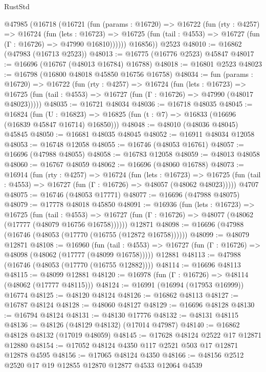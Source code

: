\begin{lexlean}{RustStd}
\begin{coremodule}
    @47985
      (@16718
        (@16721
          (fun (params : @16720) =>
          @16722
            (fun (rty : @4257) =>
            @16724
              (fun (lets : @16723) =>
              @16725 (fun (tail : @4553) => @16727 (fun (Γ : @16726) => @47990 @16810))))))
        @16856))
    @2523
@48010 := @16862 (@47983 (@16713 @2523))
@48013 := @16775 (@16776 @2523) @45847
@48017 := @16696 (@16767 (@48013 @16784) @16788)
@48018 := @16801 @2523
@48023 := @16798 (@16800 @48018 @45850 @16756 @16758)
@48034 := fun (params : @16720) =>
  @16722
    (fun (rty : @4257) =>
    @16724
      (fun (lets : @16723) =>
      @16725 (fun (tail : @4553) => @16727 (fun (Γ : @16726) => @47990 (@48017 @48023)))))
@48035 := @16721 @48034
@48036 := @16718 @48035
@48045 := @16824
    (fun (U : @16823) => @16825 (fun (t : @7) => @16833 (@16696 (@16839 @45847 @16714) @16850)))
@48048 := @48010 (@48036 @48045) @45845
@48050 := @16681 @48035 @48045
@48052 := @16911 @48034 @12058
@48053 := @16748 @12058
@48055 := @16746 (@48053 @16761)
@48057 := @16696 (@47988 @48055)
@48058 := @16783 @12058
@48059 := @48013 @48058
@48060 := @16767 @48059
@48062 := @16696 (@48060 @16788)
@48073 := @16914
    (fun (rty : @4257) =>
    @16724
      (fun (lets : @16723) =>
      @16725 (fun (tail : @4553) => @16727 (fun (Γ : @16726) => @48057 (@48062 @48023)))))
    @4707
@48075 := @16746 (@48053 @17771)
@48077 := @16696 (@47988 @48075)
@48079 := @17778 @48018 @45850
@48091 := @16936
    (fun (lets : @16723) =>
    @16725
      (fun (tail : @4553) =>
      @16727 (fun (Γ : @16726) => @48077 (@48062 (@17777 (@48079 @16756 @16758))))))
    @12871
@48098 := @16696 (@47988 (@16746 (@48053 (@17770 (@16755 (@12872 @16758))))))
@48099 := @48079 @12871
@48108 := @16960
    (fun (tail : @4553) => @16727 (fun (Γ : @16726) => @48098 (@48062 (@17777 (@48099 @16758)))))
    @12881
@48113 := @47988 (@16746 (@48053 (@17770 (@16755 @12882))))
@48114 := @16696 @48113
@48115 := @48099 @12881
@48120 := @16978 (fun (Γ : @16726) => @48114 (@48062 (@17777 @48115)))
@48124 := @16991 (@16994 (@17953 @16999)) @16774
@48125 := @48120 @48124
@48126 := @16862 @48113
@48127 := @16787 @48124
@48128 := @48060 @48127
@48129 := @16696 @48128
@48130 := @16794 @48124
@48131 := @48130 @17776
@48132 := @48131 @48115
@48136 := @48126 (@48129 @48132) (@17014 @47987)
@48140 := @16862 @48128 @48132 (@17019 @48059)
@48145 := @17628 @48124 @2522 @17 @12871 @12880
@48154 := @17052 @48124 @4350 @117 @2521 @503 @17 @12871 @12878 @4595
@48156 := @17065 @48124 @4350
@48166 := @48156 @2512 @2520 @17 @19 @12855 @12870 @12877 @4533 @12064 @4539

\end{coremodule}
\end{lexlean}
